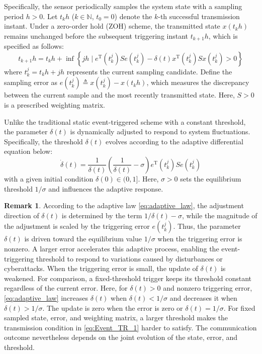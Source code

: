 \documentclass[preprint,review,fleqn,sort&compress,3p]{elsarticle}
\theoremstyle{definition} %
\theoremstyle{definition}%
\newtheorem{rem}{Remark}[section]
\begin{document}
Specifically, the sensor periodically samples the system state with a sampling period $h>0$. Let $t_kh$ ($k \in \mathbb{N}$, $t_0 = 0$) denote the $k$-th successful transmission instant. Under a zero-order hold (ZOH) scheme, the transmitted state $x(t_k h)$ remains unchanged before the subsequent triggering instant $t_{k+1}h$, which is specified as follows:
\begin{equation} \label{eq:Event_TR_1}
	t_{k+1}h = t_k h + \inf \left\{ jh \mid e^{\mathrm{T}}(t^j_{k}) S e(t^j_{k}) - \delta(t) x^{\mathrm{T}}(t_{k}^j) S x(t_{k}^j) > 0 \right\}
\end{equation}
where $t_k^j=t_kh+jh$ represents the current sampling candidate.
Define the sampling error as
$e(t_k^j)\triangleq x(t_k^j)-x(t_kh)$, which measures the discrepancy between the current sample and the most recently transmitted state.
Here, $S>0$ is a prescribed weighting matrix.

Unlike the traditional static event-triggered scheme with a constant threshold, the parameter $\delta(t)$ is dynamically adjusted to respond to system fluctuations. Specifically, the threshold $\delta(t)$ evolves according to the adaptive differential equation below:
\begin{equation} \label{eq:adaptive_law}
	\dot{\delta}(t) = \frac{1}{\delta(t)} \left( \frac{1}{\delta(t)} - \sigma \right) e^{\mathrm{T}}(t^j_{k}) S e(t^j_{k})
\end{equation}
with a given initial condition $\delta(0) \in (0, 1]$. Here, $\sigma>0$ sets the equilibrium threshold $1/\sigma$ and influences the adaptive response.

\begin{rem}
	According to the adaptive law \eqref{eq:adaptive_law}, the adjustment direction of $\delta(t)$ is determined by the term $1/\delta(t)-\sigma$, while the magnitude of the adjustment is scaled by the triggering error $e(t^j_k)$. Thus, the parameter $\delta(t)$ is driven toward the equilibrium value $1/\sigma$ when the triggering error is nonzero. A larger error accelerates this adaptive process, enabling the event-triggering threshold to respond to variations caused by disturbances or cyberattacks. When the triggering error is small, the update of $\delta(t)$ is weakened.
For comparison, a fixed-threshold trigger keeps its threshold constant regardless of the current error. Here, for $\delta(t)>0$ and nonzero triggering error, \eqref{eq:adaptive_law} increases $\delta(t)$ when $\delta(t)<1/\sigma$ and decreases it when $\delta(t)>1/\sigma$. The update is zero when the error is zero or $\delta(t)=1/\sigma$. For fixed sampled state, error, and weighting matrix, a larger threshold makes the transmission condition in \eqref{eq:Event_TR_1} harder to satisfy. The communication outcome nevertheless depends on the joint evolution of the state, error, and threshold.
\end{rem}
\end{document}
